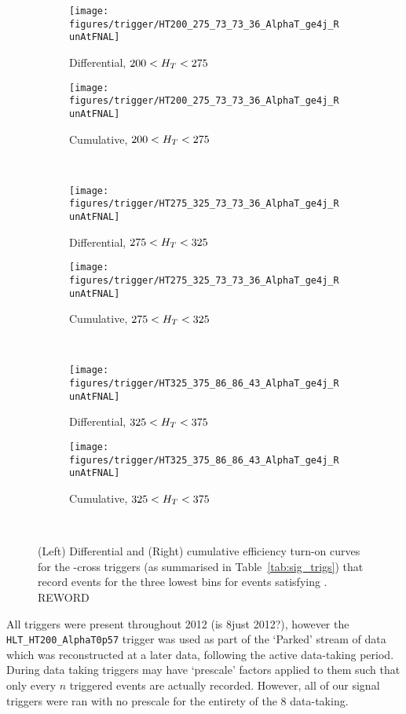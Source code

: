 \begin{figure}[!h]
  \centering
    
    \begin{subfigure}[b]{0.48\textwidth}
      \texttt{[image: figures/trigger/HT200\_275\_73\_73\_36\_AlphaT\_ge4j\_RunAtFNAL]}
      \caption{Differential, $200 < H_T < 275 $\gev}
    \end{subfigure}
    \begin{subfigure}[b]{0.48\textwidth}
      \texttt{[image: figures/trigger/HT200\_275\_73\_73\_36\_AlphaT\_ge4j\_RunAtFNAL]}
      \caption{Cumulative, $200 < H_T < 275 $\gev}
    \end{subfigure} \\
    \begin{subfigure}[b]{0.48\textwidth}
      \texttt{[image: figures/trigger/HT275\_325\_73\_73\_36\_AlphaT\_ge4j\_RunAtFNAL]}
      \caption{Differential, $275 < H_T < 325 $\gev}
    \end{subfigure}
    \begin{subfigure}[b]{0.48\textwidth}
      \texttt{[image: figures/trigger/HT275\_325\_73\_73\_36\_AlphaT\_ge4j\_RunAtFNAL]}
      \caption{Cumulative, $275 < H_T < 325 $\gev}
    \end{subfigure} \\
    \begin{subfigure}[b]{0.48\textwidth}
      \texttt{[image: figures/trigger/HT325\_375\_86\_86\_43\_AlphaT\_ge4j\_RunAtFNAL]}
      \caption{Differential, $325 < H_T < 375 $\gev}
    \end{subfigure}
    \begin{subfigure}[b]{0.48\textwidth}
      \texttt{[image: figures/trigger/HT325\_375\_86\_86\_43\_AlphaT\_ge4j\_RunAtFNAL]}
      \caption{Cumulative, $325 < H_T < 375 $\gev}
    \end{subfigure} \\
  
    \caption{\label{fig:eff_alphat_ge4j}
      (Left) Differential and (Right) cumulative efficiency turn-on
      curves for the \HT-\alphat cross triggers (as summarised in
      Table~\ref{tab:sig_trigs}) that record events for the
      three lowest \HT bins  for events satisfying \njhigh. REWORD
    }
\end{figure}

All triggers were present throughout 2012 (is 8\tev just 2012?), however the 
\\\verb!HLT_HT200_AlphaT0p57! trigger was used as part of the `Parked' stream of 
data which was reconstructed at a later data, following the active data-taking 
period. During data taking triggers may have `prescale' factors applied to them 
such that only every $n$ triggered events are actually recorded. However, all of
our signal triggers were ran with no prescale for the entirety of the 8\tev
data-taking.



